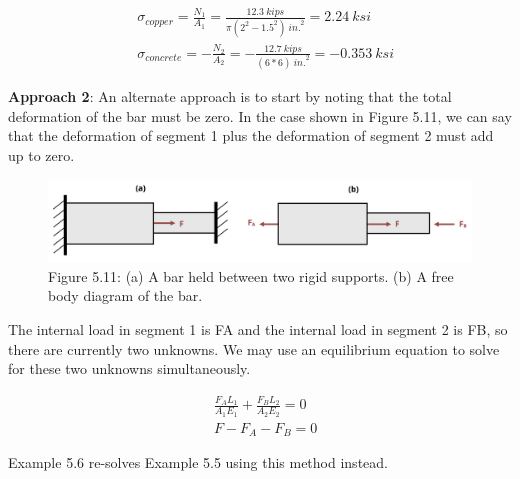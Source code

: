 \documentclass[
  letterpaper,
  DIV=11,
  numbers=noendperiod]{scrreprt}
\begin{document}
\begin{tcolorbox}
\begin{tcolorbox}
\[
\begin{aligned}
& \sigma_{copper}=\frac{N_1}{A_1}=\frac{12.3{~kips}}{\pi(2^2-1.5^2){~in.}^2}=2.24 {~ksi} \\
& \sigma_{concrete}=-\frac{N_2}{A_2}=-\frac{12.7{~kips}}{(6 * 6){~in.}^2}=-0.353 {~ksi}
\end{aligned}
\]

\end{tcolorbox}

\end{tcolorbox}

\textbf{Approach 2}: An alternate approach is to start by noting that
the total deformation of the bar must be zero. In the case shown in
Figure 5.11, we can say that the deformation of segment 1 plus the
deformation of segment 2 must add up to zero.

\begin{figure}[H]

{\centering \includegraphics{images/PNGs/Figure 5.12.png}

}

\caption{Figure 5.11: (a) A bar held between two rigid supports. (b) A
free body diagram of the bar.}

\end{figure}%

The internal load in segment 1 is FA and the internal load in segment 2
is FB, so there are currently two unknowns. We may use an equilibrium
equation to solve for these two unknowns simultaneously.

\[
\begin{aligned} & \frac{F_A L_1}{A_1 E_1}+\frac{F_B L_2}{A_2 E_2}=0 \\ & F-F_A-F_B=0\end{aligned}\]

Example 5.6 re-solves Example 5.5 using this method instead.
\end{document}

